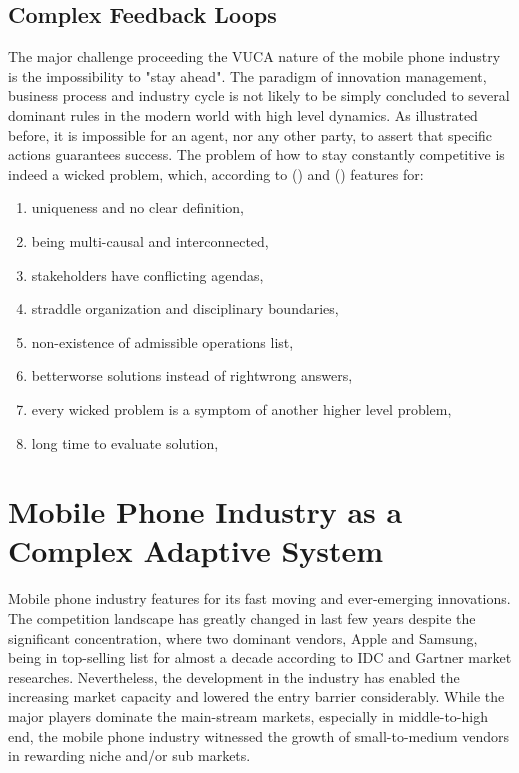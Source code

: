 \documentclass[utf8,english]{gradu3}
\begin{document}
\section{Complex Feedback Loops}

The major challenge proceeding the VUCA nature of the mobile phone industry is the impossibility to "stay ahead". The paradigm of innovation management, business process and industry cycle is not likely to be simply concluded to several dominant rules in the modern world with high level dynamics. As illustrated before, it is impossible for an agent, nor any other party, to assert that specific actions guarantees success. The problem of how to stay constantly competitive is indeed a wicked problem, which, according to \citeauthor{rittel1974wicked} (\citeyear{rittel1974wicked}) and \citeauthor{buchanan1992wicked} (\citeyear{buchanan1992wicked}) features for:

\begin{enumerate}
    \item uniqueness and no clear definition,
    \item being multi-causal and interconnected,
    \item stakeholders have conflicting agendas,
    \item straddle organization and disciplinary boundaries,
    \item non-existence of admissible operations list,
    \item better\/worse solutions instead of right\/wrong answers,
    \item every wicked problem is a symptom of another higher level problem,
    \item long time to evaluate solution,
\end{enumerate}

\chapter{Mobile Phone Industry as a Complex Adaptive System}

Mobile phone industry features for its fast moving and ever-emerging innovations. The competition landscape has greatly changed in last few years despite the significant concentration, where two dominant vendors, Apple and Samsung, being in top-selling list for almost a decade according to IDC and Gartner market researches. Nevertheless, the development in the industry has enabled the increasing market capacity and lowered the entry barrier considerably. While the major players dominate the main-stream markets, especially in middle-to-high end, the mobile phone industry witnessed the growth of small-to-medium vendors in rewarding niche and/or sub markets.
\end{document}
